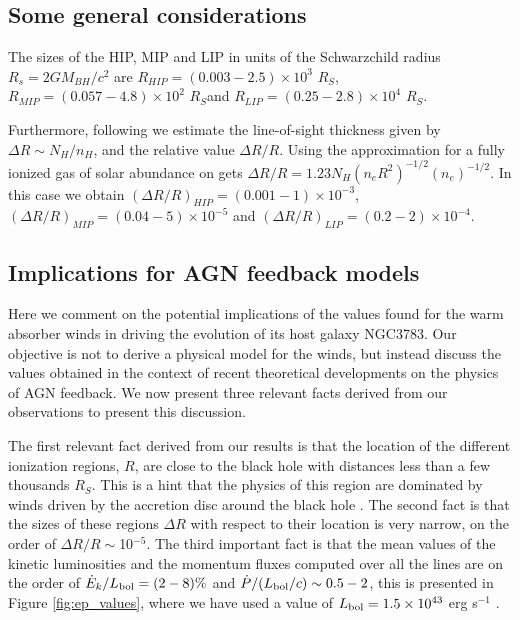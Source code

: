 \documentclass{report}
\begin{document}
\subsection*{Some general considerations}
The sizes of the HIP, MIP and LIP in units of the Schwarzchild radius
$R_s=2GM_{BH}/c^2$ are $R_{HIP}= (0.003-2.5)\times 10^3$ $R_S$,
$R_{MIP} = (0.057-4.8)\times 10^2$ $R_S$and $R_{LIP}=(0.25 -
2.8)\times 10^4$ $R_S$. 

Furthermore, following \cite{Krongold2007a} we estimate
the line-of-sight thickness given by $\Delta R\sim N_{H}/n_H$, and the
relative value $\Delta R/R$. Using the approximation for a fully
ionized gas of solar abundance on gets $\Delta R/R=1.23N_H (n_e
R^2)^{-1/2} (n_e)^{-1/2}$. In this case we obtain $(\Delta R/
R)_{HIP}=(0.001-1)\times 10^{-3}$, $(\Delta R/ R)_{MIP}=(0.04-5)\times
10^{-5}$ and $(\Delta R/ R)_{LIP}=(0.2-2)\times 10^{-4}$. 

\subsection*{Implications for AGN feedback models}

Here we comment on the potential implications of the values found for
the warm absorber winds in driving the evolution of its host galaxy
NGC3783. Our objective is not to derive a physical model for the
winds, but instead discuss the values obtained in the context of
recent theoretical developments on the physics of AGN feedback. We
now present three relevant facts derived from our observations to
present this discussion.


The first relevant fact derived from our results is that the location of the
different ionization regions, $R$, are close to the black hole with
distances less than a few thousands $R_S$. This is a hint that the
physics of this region are dominated by winds driven by the accretion
disc around the black hole \cite{Murray1995}. The second fact is that
the sizes of these regions $\Delta R$ with respect to their location
is very narrow, on the order of $\Delta R/R\sim $10$^{-5}$. The third
important fact is that the mean values of the kinetic luminosities and the
momentum fluxes computed over all the lines are on the order of
$\dot{E}_k/L_{\rm bol}= (2-8)\%$ and $\dot{P}/(L_{\rm bol}/c)\sim 0.5
-2 $, this is presented in Figure \ref{fig:ep_values}, where we have
used a value of $L_{\rm bol}=1.5\times 10^{43}$ erg s$^{-1}$
\cite{Netzer2003}. 
\end{document}
